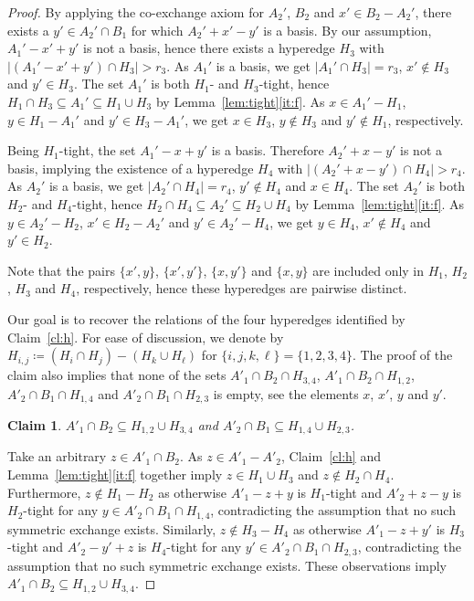 \documentclass[11pt,a4paper]{article}
\theoremstyle{plain}
\newtheorem{cl}[thm]{Claim}
\theoremstyle{definition}
\newenvironment{claimproof}[1][\proofname]
  {%
    \proof[#1]%
      \renewcommand*\qedsymbol{$\bullet$}%
  }
  {%
    \endproof%
  }
\begin{document}
\begin{proof}
\begin{claimproof}
By applying the co-exchange axiom for $A_2'$, $B_2$ and $x'\in B_2-A_2'$, there exists a $y'\in A_2'\cap B_1$ for which $A_2'+x'-y'$ is a basis. By our assumption, $A_1'-x'+y'$ is not a basis, hence there exists a hyperedge $H_3$ with $|(A_1'-x'+y')\cap H_3|>r_3$. As $A_1'$ is a basis, we get $|A_1'\cap H_3|=r_3$, $x'\notin H_3$ and $y'\in H_3$. The set $A_1'$ is both $H_1$- and $H_3$-tight, hence $H_1\cap H_3\subseteq A_1'\subseteq H_1\cup H_3$ by Lemma~\ref{lem:tight}\ref{it:f}. As $x\in A_1'-H_1$, $y\in H_1-A_1'$ and $y'\in H_3-A_1'$, we get $x\in H_3$, $y\notin H_3$ and $y'\notin H_1$, respectively.

Being $H_1$-tight, the set $A_1'-x+y'$ is a basis. Therefore $A_2'+x-y'$ is not a basis, implying the existence of a hyperedge $H_4$ with $|(A_2'+x-y')\cap H_4|>r_4$. As $A_2'$ is a basis, we get $|A_2'\cap H_4|=r_4$, $y'\notin H_4$ and $x\in H_4$. The set $A_2'$ is both $H_2$- and $H_4$-tight, hence $H_2\cap H_4\subseteq A_2'\subseteq H_2\cup H_4$ by Lemma~\ref{lem:tight}\ref{it:f}. As $y\in A_2'-H_2$, $x'\in H_2-A_2'$ and $y'\in A_2'-H_4$, we get $y\in H_4$, $x'\notin H_4$ and $y'\in H_2$.

Note that the pairs $\{x',y\}$, $\{x',y'\}$, $\{x,y'\}$ and $\{x,y\}$ are included only in $H_1$, $H_2$, $H_3$ and $H_4$, respectively, hence these hyperedges are pairwise distinct.
\end{claimproof}

Our goal is to recover the relations of the four hyperedges identified by Claim~\ref{cl:h}. For ease of discussion, we denote by $H_{i,j}\coloneqq(H_i\cap H_j)-(H_k\cup H_\ell)$ for $\{i,j,k,\ell\}=\{1,2,3,4\}$. The proof of the claim also implies that none of the sets $A'_1\cap B_2\cap H_{3,4}$, $A'_1\cap B_2\cap H_{1,2}$, $A'_2\cap B_1\cap H_{1,4}$ and $A'_2\cap B_1\cap H_{2,3}$ is empty, see the elements $x$, $x'$, $y$ and $y'$.

\begin{cl}\label{cl:symdiff}
$A'_1\cap B_2\subseteq H_{1,2}\cup H_{3,4}$ and 
$A'_2\cap B_1\subseteq H_{1,4}\cup H_{2,3}$.
\end{cl}
\begin{claimproof}
Take an arbitrary $z\in A'_1\cap B_2$. As $z\in A'_1-A'_2$, Claim~\ref{cl:h} and Lemma~\ref{lem:tight}\ref{it:f} together imply $z\in H_1\cup H_3$ and $z\notin H_2\cap H_4$. Furthermore, $z\notin H_1-H_2$ as otherwise $A'_1-z+y$ is $H_1$-tight and $A'_2+z-y$ is $H_2$-tight for any $y\in A'_2\cap B_1\cap H_{1,4}$, contradicting the assumption that no such symmetric exchange exists. Similarly, $z\notin H_3-H_4$ as otherwise $A'_1-z+y'$ is $H_3$-tight and $A'_2-y'+z$ is $H_4$-tight for any $y'\in A'_2\cap B_1\cap H_{2,3}$, contradicting the assumption that no such symmetric exchange exists. These observations imply $A'_1\cap B_2\subseteq H_{1,2}\cup H_{3,4}$.


\end{claimproof}
\end{proof}
\end{document}
